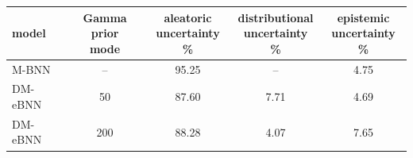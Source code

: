 \begin{tabular}{lcccc}
\toprule
model & \shortstack{Gamma prior\\mode} & \shortstack{aleatoric\\uncertainty \%} & \shortstack{distributional\\uncertainty \%} & \shortstack{epistemic\\uncertainty \%} \\
\midrule
M-BNN & -- & 95.25 & -- & 4.75 \\
DM-eBNN & 50 & 87.60 & 7.71 & 4.69 \\
DM-eBNN & 200 & 88.28 & 4.07 & 7.65 \\
\bottomrule
\end{tabular}
